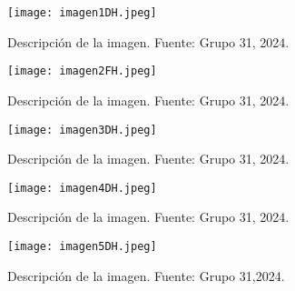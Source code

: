 \begin{figure}[h]
    \centering
    \texttt{[image: imagen1DH.jpeg]}
    \caption{Descripción de la imagen. Fuente: Grupo 31, 2024.}
    \label{fig:ejemplo}
\end{figure}

\begin{figure}[h]
    \centering
    \texttt{[image: imagen2FH.jpeg]}
    \caption{Descripción de la imagen. Fuente: Grupo 31, 2024.}
    \label{fig:ejemplo}
\end{figure}

\begin{figure}[h]
    \centering
    \texttt{[image: imagen3DH.jpeg]}
    \caption{Descripción de la imagen. Fuente: Grupo 31, 2024.}
    \label{fig:ejemplo}
\end{figure}

\begin{figure}[h]
    \centering
    \texttt{[image: imagen4DH.jpeg]}
    \caption{Descripción de la imagen. Fuente: Grupo 31, 2024.}
    \label{fig:ejemplo}
\end{figure}

\begin{figure}[h]
    \centering
    \texttt{[image: imagen5DH.jpeg]}
    \caption{Descripción de la imagen. Fuente: Grupo 31,2024.}
    \label{fig:ejemplo}
\end{figure}


